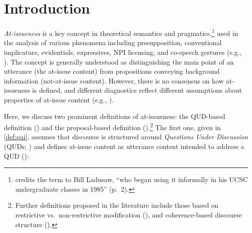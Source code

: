 \documentclass[times,linguex]{glossa}
\begin{document}
\section{Introduction} \label{sec:1_introduction}
\textit{At-issueness} is a key concept in theoretical semantics and pragmatics,\footnote{\citet{potts_presupposition_2015} credits the term to Bill Ladusaw, \enquote{who began using it informally in his UCSC undergraduate classes in 1985} (p.~2).} used in the analysis of various phenomena including presupposition, conventional implicature, evidentials, expressives, NPI licensing, and co-speech gestures (e.g., \citealt{faller_semantics_2002,faller_discourse_2019,horn_assertoric_2002,potts_logic_2005,simons_what_2010,lee_evidentiality_2011,tonhauser_how_2018,esipova_composition_2019,korotkova_evidential_2020,barnes_information_2023}). The concept is generally understood as distinguishing the main point of an utterance (the at-issue content) from propositions conveying background information (not-at-issue content). However, there is no consensus on how at-issueness is defined, and different diagnostics reflect different assumptions about properties of at-issue content (e.g., \citealt{tonhauser_diagnosing_2012,snider_at-issueness_2017,snider_anaphoric_2017,snider_distinguishing_2018,tonhauser_how_2018,koev_notions_2018,faller_discourse_2019,esipova_composition_2019,korotkova_evidential_2020}). %

Here, we discuss two prominent definitions of at-issueness: the QUD-based definition (\citealp{amaral_review_2007,simons_what_2010}) and the proposal-based definition (\citealt{murray_evidentiality_2010,murray_varieties_2014,anderbois_crossing_2010,anderbois_at-issue_2015,koev_apposition_2013}).\footnote{Further definitions proposed in the literature include those based on restrictive vs.\ non-restrictive modification (\citealt{esipova_composition_2019,esipova_not-at-issueness_2021}), and coherence-based discourse structure (\citealt{hunter_shapes_2016,jasinskaja_not_2016,koev_notions_2018}). %
} The first one, given in \ref{def:qai}, assumes that discourse is structured around \textit{Questions Under Discussion} (QUDs; \citealt{roberts_information_2012,ginzburg_interrogatives_1996}) and defines at-issue content as utterance content intended to address a QUD (\citealp{amaral_review_2007,simons_what_2010}):
\end{document}
